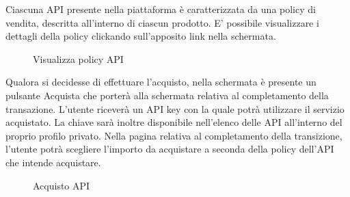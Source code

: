 Ciascuna API presente nella piattaforma è caratterizzata da una policy di vendita, descritta all'interno di ciascun prodotto. E' possibile visualizzare i dettagli della policy clickando sull'apposito link nella schermata.

\label{Visualizza policy API}
\begin{figure}[H]
	\centering
	\caption{Visualizza policy API}
\end{figure}

Qualora si decidesse di effettuare l'acquisto, nella schermata è presente un pulsante Acquista che porterà alla schermata relativa al completamento della transazione. L'utente riceverà un API key con la quale potrà utilizzare il servizio acquistato. La chiave sarà inoltre disponibile nell'elenco delle API all'interno del proprio profilo privato. Nella pagina relativa al completamento della transizione, l'utente potrà scegliere l'importo da acquistare a seconda della policy dell'API che intende acquistare. 

\label{Acquisto API}
\begin{figure}[H]
	\centering
	\caption{Acquisto API}
\end{figure}
